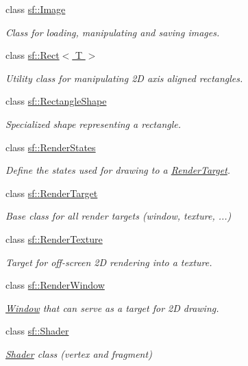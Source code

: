 \begin{DoxyCompactItemize}
class \hyperlink{classsf_1_1_image}{sf\-::\-Image}
\begin{DoxyCompactList}\small\item\em Class for loading, manipulating and saving images. \end{DoxyCompactList}\item 
class \hyperlink{classsf_1_1_rect}{sf\-::\-Rect$<$ T $>$}
\begin{DoxyCompactList}\small\item\em Utility class for manipulating 2\-D axis aligned rectangles. \end{DoxyCompactList}\item 
class \hyperlink{classsf_1_1_rectangle_shape}{sf\-::\-Rectangle\-Shape}
\begin{DoxyCompactList}\small\item\em Specialized shape representing a rectangle. \end{DoxyCompactList}\item 
class \hyperlink{classsf_1_1_render_states}{sf\-::\-Render\-States}
\begin{DoxyCompactList}\small\item\em Define the states used for drawing to a \hyperlink{classsf_1_1_render_target}{Render\-Target}. \end{DoxyCompactList}\item 
class \hyperlink{classsf_1_1_render_target}{sf\-::\-Render\-Target}
\begin{DoxyCompactList}\small\item\em Base class for all render targets (window, texture, ...) \end{DoxyCompactList}\item 
class \hyperlink{classsf_1_1_render_texture}{sf\-::\-Render\-Texture}
\begin{DoxyCompactList}\small\item\em Target for off-\/screen 2\-D rendering into a texture. \end{DoxyCompactList}\item 
class \hyperlink{classsf_1_1_render_window}{sf\-::\-Render\-Window}
\begin{DoxyCompactList}\small\item\em \hyperlink{classsf_1_1_window}{Window} that can serve as a target for 2\-D drawing. \end{DoxyCompactList}\item 
class \hyperlink{classsf_1_1_shader}{sf\-::\-Shader}
\begin{DoxyCompactList}\small\item\em \hyperlink{classsf_1_1_shader}{Shader} class (vertex and fragment) \end{DoxyCompactList}\item 

\end{DoxyCompactItemize}
